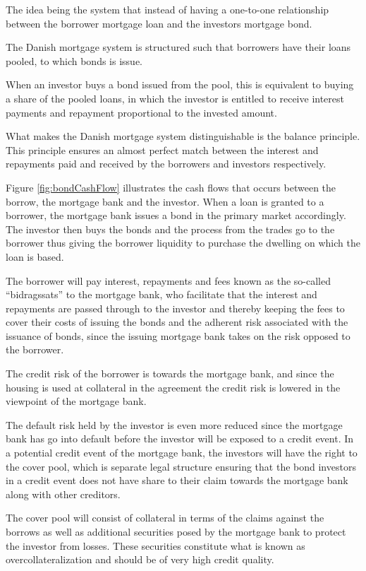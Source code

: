 \documentclass[12pt,twoside]{reedthesis}
\begin{document}
The idea being the system that instead of having a one-to-one relationship between the borrower mortgage loan and the investors mortgage bond.

The Danish mortgage system is structured such that borrowers have their loans pooled, to which bonds is issue.

When an investor buys a bond issued from the pool, this is equivalent to buying a share of the pooled loans, in which the investor is entitled to receive interest payments and repayment proportional to the invested amount.

What makes the Danish mortgage system distinguishable is the balance principle. This principle ensures an almost perfect match between the interest and repayments paid and received by the borrowers and investors respectively.

Figure \ref{fig:bondCashFlow} illustrates the cash flows that occurs between the borrow, the mortgage bank and the investor. When a loan is granted to a borrower, the mortgage bank issues a bond in the primary market accordingly. The investor then buys the bonds and the process from the trades go to the borrower thus giving the borrower liquidity to purchase the dwelling on which the loan is based.

The borrower will pay interest, repayments and fees known as the so-called ``bidragssats'' to the mortgage bank, who facilitate that the interest and repayments are passed through to the investor and thereby keeping the fees to cover their costs of issuing the bonds and the adherent risk associated with the issuance of bonds, since the issuing mortgage bank takes on the risk opposed to the borrower.

The credit risk of the borrower is towards the mortgage bank, and since the housing is used at collateral in the agreement the credit risk is lowered in the viewpoint of the mortgage bank.

The default risk held by the investor is even more reduced since the mortgage bank has go into default before the investor will be exposed to a credit event. In a potential credit event of the mortgage bank, the investors will have the right to the cover pool, which is separate legal structure ensuring that the bond investors in a credit event does not have share to their claim towards the mortgage bank along with other creditors.

The cover pool will consist of collateral in terms of the claims against the borrows as well as additional securities posed by the mortgage bank to protect the investor from losses. These securities constitute what is known as overcollateralization and should be of very high credit quality.
\end{document}
